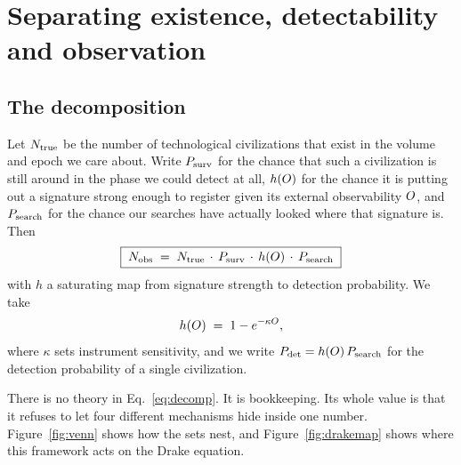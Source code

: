 \section{Separating existence, detectability and observation}
\label{sec:decomp}

\subsection{The decomposition}

Let $N_{\mathrm{true}}$ be the number of technological civilizations that exist in the
volume and epoch we care about. Write $P_{\mathrm{surv}}$ for the chance that such a
civilization is still around in the phase we could detect at all, $h(O)$ for
the chance it is putting out a signature strong enough to register given its
external observability $O$, and $P_{\mathrm{search}}$ for the chance our searches have
actually looked where that signature is. Then
\begin{equation}
  \boxed{\;N_{\mathrm{obs}} \;=\; N_{\mathrm{true}} \,\cdot\, P_{\mathrm{surv}} \,\cdot\, h(O) \,\cdot\, P_{\mathrm{search}}\;}
  \label{eq:decomp}
\end{equation}
with $h$ a saturating map from signature strength to detection probability. We
take
\begin{equation}
  h(O) \;=\; 1 - e^{-\kappa O},
  \label{eq:hdet}
\end{equation}
where $\kappa$ sets instrument sensitivity, and we write
$P_{\mathrm{det}} = h(O)\,P_{\mathrm{search}}$ for the detection probability of a single
civilization.

There is no theory in Eq.~\eqref{eq:decomp}. It is bookkeeping. Its whole value
is that it refuses to let four different mechanisms hide inside one number.
\Established{} Figure~\ref{fig:venn} shows how the sets nest, and
Figure~\ref{fig:drakemap} shows where this framework acts on the Drake
equation.

